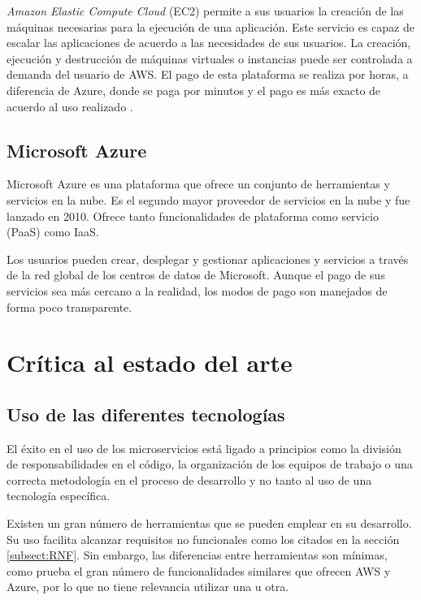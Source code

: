\documentclass[11pt,spanish,listoffigures]{tfgetsinf}
\begin{document}
\textit{Amazon Elastic Compute Cloud} (EC2) permite a sus usuarios la creación de las máquinas necesarias para la ejecución de una aplicación. Este servicio es capaz de escalar las aplicaciones de acuerdo a las necesidades de sus usuarios. La creación, ejecución y destrucción de máquinas virtuales o instancias puede ser controlada a demanda del usuario de AWS. El pago de esta plataforma se realiza por horas, a diferencia de Azure, donde se paga por minutos y el pago es más exacto de acuerdo al uso realizado \cite{Qaisi2016}.

\subsection{Microsoft Azure}

Microsoft Azure \cite{Qaisi2016} es una plataforma que ofrece un conjunto de herramientas y servicios en la nube. Es el segundo mayor proveedor de servicios en la nube y fue lanzado en 2010. Ofrece tanto funcionalidades de plataforma como servicio (PaaS) como IaaS.

Los usuarios pueden crear, desplegar y gestionar aplicaciones y servicios a través de la red global de los centros de datos de Microsoft. Aunque el pago de sus servicios sea más cercano a la realidad, los modos de pago son manejados de forma poco transparente.

\newpage

\section{Crítica al estado del arte}

\subsection{Uso de las diferentes tecnologías}

El éxito en el uso de los microservicios está ligado a principios como la división de responsabilidades en el código, la organización de los equipos de trabajo o una correcta metodología en el proceso de desarrollo y no tanto al uso de una tecnología específica. 

Existen un gran número de herramientas que se pueden emplear en su desarrollo. Su uso facilita alcanzar requisitos no funcionales como los citados en la sección \ref{subsect:RNF}. Sin embargo, las diferencias entre herramientas son mínimas, como prueba el gran número de funcionalidades similares que ofrecen AWS y Azure, por lo que no tiene relevancia utilizar una u otra. 
\end{document}
